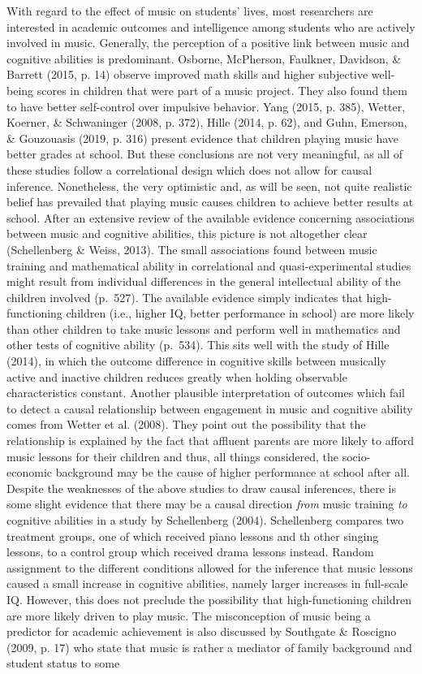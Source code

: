 \documentclass[a4, 12pt]{article}
\begin{document}
\label{ch:roleofmusic}
With regard to the effect of music on students' lives, most researchers are interested in academic outcomes and intelligence among students who are actively involved in music. Generally, the perception of a positive link between music and cognitive abilities is predominant. Osborne, McPherson, Faulkner, Davidson, \& Barrett (2015, p. 14) observe improved math skills and higher subjective well-being scores in children that were part of a music project. They also found them to have better self-control over impulsive behavior. Yang (2015, p. 385), Wetter, Koerner, \& Schwaninger (2008, p. 372), Hille (2014, p. 62), and Guhn, Emerson, \& Gouzouasis (2019, p. 316) present evidence that children playing music have better grades at school. But these conclusions are not very meaningful, as all of these studies follow a correlational design which does not allow for causal inference. Nonetheless, the very optimistic and, as will be seen, not quite realistic belief has prevailed that playing music causes children to achieve better results at school. After an extensive review of the available evidence concerning associations between music and cognitive abilities, this picture is not altogether clear (Schellenberg \& Weiss, 2013). The small associations found between music training and mathematical ability in correlational and quasi-experimental studies might result from individual differences in the general intellectual ability of the children involved (p.~527). The available evidence simply indicates that high-functioning children (i.e., higher IQ, better performance in school) are more likely than other children to take music lessons and perform well in mathematics and other tests of cognitive ability (p.~534). This sits well with the study of Hille (2014), in which the outcome difference in cognitive skills between musically active and inactive children reduces greatly when holding observable characteristics constant. Another plausible interpretation of outcomes which fail to detect a causal relationship between engagement in music and cognitive ability comes from Wetter et al. (2008). They point out the possibility that the relationship is explained by the fact that affluent parents are more likely to afford music lessons for their children and thus, all things considered, the socio-economic background may be the cause of higher performance at school after all. Despite the weaknesses of the above studies to draw causal inferences, there is some slight evidence that there may be a causal direction \emph{from} music training \emph{to} cognitive abilities in a study by Schellenberg (2004). Schellenberg compares two treatment groups, one of which received piano lessons and th other singing lessons, to a control group which received drama lessons instead. Random assignment to the different conditions allowed for the inference that music lessons caused a small increase in cognitive abilities, namely larger increases in full-scale IQ. However, this does not preclude the possibility that high-functioning children are more likely driven to play music. The misconception of music being a predictor for academic achievement is also discussed by Southgate \& Roscigno (2009, p. 17) who state that music is rather a mediator of family background and student status to some 
\end{document}
